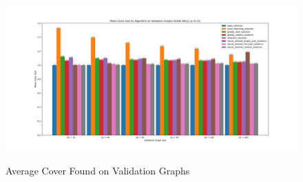 \documentclass{article}
\begin{document}
\begin{figure}
    \caption{Average Cover Found on Validation Graphs}
    \centering
    \includegraphics[scale=0.2]{../test20.png}
    \label{fig:test-20}
\end{figure}

\clearpage


\end{document}
